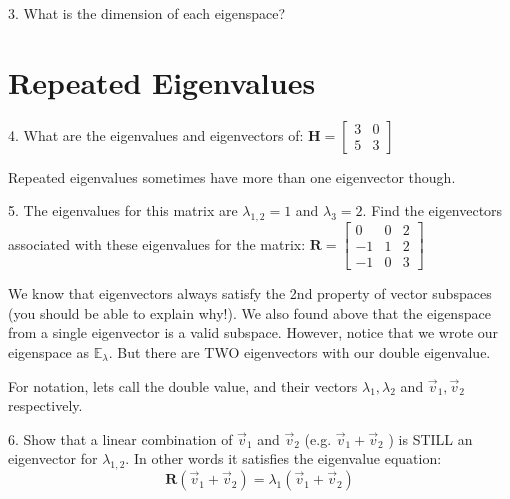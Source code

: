 \documentclass{article}
\begin{document}
\begin{flushleft}
\vspace{0.2in}

3. What is the dimension of each eigenspace?

\newpage

\section*{Repeated Eigenvalues}

4. What are the eigenvalues and eigenvectors of: 
$\textbf{H}=
\begin{bmatrix}
3 & 0 \\
5 & 3
\end{bmatrix}$

\vspace{3in}

Repeated eigenvalues sometimes have more than one eigenvector though.

\vspace{0.1in}

5. The eigenvalues for this matrix are $\lambda_{1,2}=1$ and $\lambda_3 = 2$. Find the eigenvectors associated with these eigenvalues for the matrix: 
$\textbf{R}=
\begin{bmatrix}
0 & 0 & 2 \\
-1 & 1 & 2 \\
-1 & 0 & 3
\end{bmatrix} $\\


\newpage

We know that eigenvectors always satisfy the 2nd property of vector subspaces (you should be able to explain why!). We also found above that the eigenspace from a single eigenvector is a valid subspace. However, notice that we wrote our eigenspace as $\mathbb{E}_{\lambda}$. But there are TWO eigenvectors with our double eigenvalue. 

\vspace{0.2in}

For notation, lets call the double value, and their vectors $\lambda_1 , \lambda_2$ and $\vec{v}_1 , \vec{v}_2$ respectively. 

\vspace{0.1in}

6. Show that a linear combination of $\vec{v}_1$ and $\vec{v}_2$ (e.g. $\vec{v}_1 + \vec{v}_2$ ) is STILL an eigenvector for $\lambda_{1,2}$. In other words it satisfies the eigenvalue equation:\\
\begin{equation*}
\textbf{R}(\vec{v}_1 + \vec{v}_2 ) = \lambda_1 (\vec{v}_1 + \vec{v}_2 )
\end{equation*}


\end{flushleft}
\end{document}
